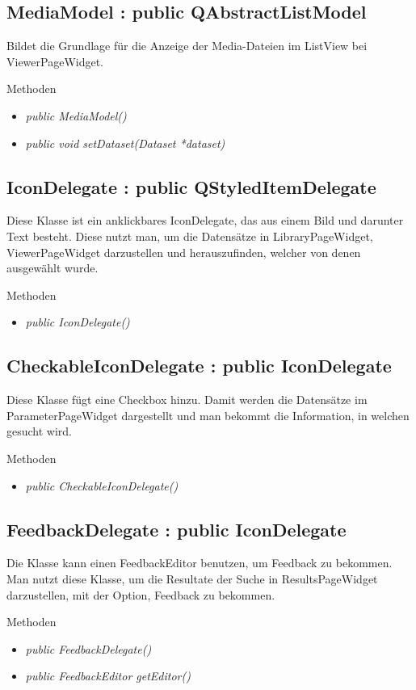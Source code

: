 \subsection*{MediaModel : public QAbstractListModel}
Bildet die Grundlage für die Anzeige der Media-Dateien im ListView bei ViewerPageWidget.

Methoden
\begin{itemize}
	\item\textit{public MediaModel()}
	\item\textit{public void setDataset(Dataset *dataset)}
\end{itemize}

\subsection*{IconDelegate : public QStyledItemDelegate}
Diese Klasse ist ein anklickbares IconDelegate, das aus einem Bild und darunter Text besteht. Diese nutzt man, um die Datensätze in LibraryPageWidget, ViewerPageWidget darzustellen und herauszufinden, welcher von denen ausgewählt wurde.

Methoden
\begin{itemize}
	\item\textit{public IconDelegate()}
\end{itemize}

\subsection*{CheckableIconDelegate : public IconDelegate}
Diese Klasse fügt eine Checkbox hinzu. Damit werden die Datensätze im ParameterPageWidget dargestellt und man bekommt die Information, in welchen gesucht wird.

Methoden
\begin{itemize}
	\item\textit{public CheckableIconDelegate()}
\end{itemize} 

\subsection*{FeedbackDelegate : public IconDelegate}
Die Klasse kann einen FeedbackEditor benutzen, um Feedback zu bekommen. Man nutzt diese Klasse, um die Resultate der Suche in ResultsPageWidget darzustellen, mit der Option, Feedback zu bekommen. 

Methoden
\begin{itemize}
	\item\textit{public FeedbackDelegate()}
	\item\textit{public FeedbackEditor getEditor()}
\end{itemize}


